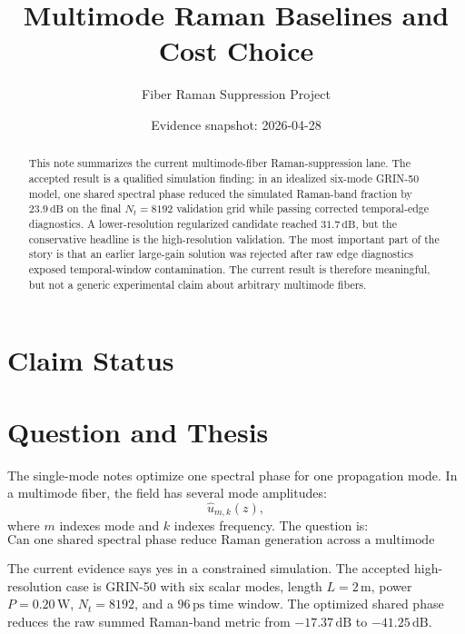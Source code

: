 \documentclass[11pt]{article}
\title{Multimode Raman Baselines and Cost Choice}
\author{Fiber Raman Suppression Project}
\date{Evidence snapshot: 2026-04-28}
\begin{document}
\maketitle

\begin{abstract}
This note summarizes the current multimode-fiber Raman-suppression lane. The
accepted result is a qualified simulation finding: in an idealized six-mode
GRIN-50 model, one shared spectral phase reduced the simulated Raman-band
fraction by \(23.9\,\mathrm{dB}\) on the final \(N_t=8192\) validation grid
while passing corrected temporal-edge diagnostics. A lower-resolution
regularized candidate reached \(31.7\,\mathrm{dB}\), but the conservative
headline is the high-resolution validation. The most important part of the
story is that an earlier large-gain solution was rejected after raw edge
diagnostics exposed temporal-window contamination. The current result is
therefore meaningful, but not a generic experimental claim about arbitrary
multimode fibers.
\end{abstract}

\section*{Claim Status}

\section{Question and Thesis}

The single-mode notes optimize one spectral phase for one propagation mode. In
a multimode fiber, the field has several mode amplitudes:
\[
    \hat u_{m,k}(z),
\]
where \(m\) indexes mode and \(k\) indexes frequency. The question is:
\[
    \text{Can one shared spectral phase reduce Raman generation across a multimode field?}
\]

The current evidence says yes in a constrained simulation. The accepted
high-resolution case is GRIN-50 with six scalar modes, length
\(L=2\,\mathrm{m}\), power \(P=0.20\,\mathrm{W}\), \(N_t=8192\), and a
\(96\,\mathrm{ps}\) time window. The optimized shared phase reduces the raw
summed Raman-band metric from \(-17.37\,\mathrm{dB}\) to
\(-41.25\,\mathrm{dB}\).
\end{document}
